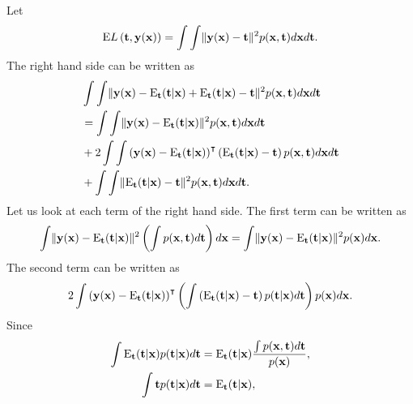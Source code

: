 \subsection{}
Let
%
\begin{equation}
{\rm E} L\left( \mathbf{t}, \mathbf{y} (\mathbf{x}) \right) = \int \int \lVert \mathbf{y}(\mathbf{x}) - \mathbf{t} \rVert ^ 2 p(\mathbf{x}, \mathbf{t}) d\mathbf{x} d\mathbf{t}.
\end{equation}
%
The right hand side can be written as
%
\begin{equation}
\begin{aligned}
&\int \int \lVert \mathbf{y}(\mathbf{x}) - {\rm E}_\mathbf{t} (\mathbf{t} | \mathbf{x}) + {\rm E}_\mathbf{t} (\mathbf{t} | \mathbf{x}) - \mathbf{t} \rVert ^ 2 p(\mathbf{x}, \mathbf{t}) d\mathbf{x} d\mathbf{t} \\ 
&= \int \int \lVert \mathbf{y}(\mathbf{x}) - {\rm E}_\mathbf{t} (\mathbf{t} | \mathbf{x}) \rVert ^ 2 p(\mathbf{x}, \mathbf{t}) d\mathbf{x} d\mathbf{t} \\
&+ 2 \int \int \left( \mathbf{y}(\mathbf{x}) - {\rm E}_\mathbf{t} (\mathbf{t} | \mathbf{x}) \right) ^ \intercal \left( {\rm E}_\mathbf{t} (\mathbf{t} | \mathbf{x}) - \mathbf{t} \right) p(\mathbf{x}, \mathbf{t}) d\mathbf{x} d\mathbf{t} \\
&+ \int \int \lVert {\rm E}_\mathbf{t} (\mathbf{t} | \mathbf{x}) - \mathbf{t} \rVert ^ 2 p(\mathbf{x}, \mathbf{t}) d\mathbf{x} d\mathbf{t}.
\end{aligned}
\end{equation}
%
Let us look at each term of the right hand side.
The first term can be written as
%
\begin{equation}
\int \lVert \mathbf{y}(\mathbf{x}) - {\rm E}_\mathbf{t} (\mathbf{t} | \mathbf{x}) \rVert ^ 2 \left( \int p(\mathbf{x}, \mathbf{t}) d\mathbf{t} \right) d\mathbf{x} = \int \lVert \mathbf{y}(\mathbf{x}) - {\rm E}_\mathbf{t} (\mathbf{t} | \mathbf{x}) \rVert ^ 2 p(\mathbf{x}) d\mathbf{x}.
\end{equation}
%
The second term can be written as
%
\begin{equation}
2 \int \left( \mathbf{y}(\mathbf{x}) - {\rm E}_\mathbf{t} (\mathbf{t} | \mathbf{x}) \right) ^ \intercal \left( \int \left( {\rm E}_\mathbf{t} (\mathbf{t} | \mathbf{x}) - \mathbf{t} \right) p(\mathbf{t} | \mathbf{x}) d\mathbf{t} \right) p(\mathbf{x}) d\mathbf{x}.
\end{equation}
%
Since
%
\begin{equation}
\begin{aligned}
\int {\rm E}_\mathbf{t} (\mathbf{t} | \mathbf{x}) p(\mathbf{t} | \mathbf{x}) d\mathbf{t} &= {\rm E}_\mathbf{t} (\mathbf{t} | \mathbf{x}) \frac{\int p(\mathbf{x}, \mathbf{t}) d\mathbf{t}}{p(\mathbf{x})}, \\
\int \mathbf{t} p(\mathbf{t} | \mathbf{x}) d\mathbf{t} &= {\rm E}_\mathbf{t} (\mathbf{t} | \mathbf{x}),
\end{aligned}
\end{equation}
